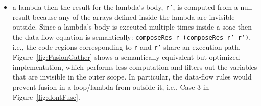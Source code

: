 \documentclass{sigplanconf}  %
\newcommand{\emp}[1]{\textcolor{DikuRed}{ #1}}
\begin{document}
\begin{itemize}
    \item a lambda then the result for the lambda's body, {\tt r'},
                is computed from a null result because any of the arrays defined 
                inside the lambda are invisible outside.  Since a lambda's body
                is executed multiple times inside a {\sc soac} then
                the data flow equation is semantically:
                {\tt composeRes r (composeRes r' r')}, i.e., the code regions
                corresponding to {\tt r} and {\tt r'} share an execution path.
            Figure~\ref{fig:FusionGather} shows a semantically equivalent but
                optimized implementation, which performs less computation and
                filters out the variables that are invisible in the outer scope.
            In particular, the data-flow rules would prevent fusion in a loop/lambda
            from outside it, i.e., \emp{Case 3} in Figure~\ref{fig:dontFuse}.

\end{itemize}
\end{document}
